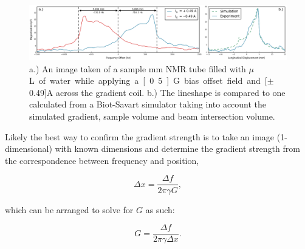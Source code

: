\documentclass[PaulGanssle-Thesis.tex]{subfiles}
\begin{document}
\begin{figure}[ht!]
\includegraphics[width=\tw]{figures/coils/GradientImage.png}
\caption{a.) An image taken of a sample \unit[5]{mm} NMR tube filled with \unit[100]{$\mu$L} of water while applying a \unit[0.5]{G} bias offset field and \unit[$\pm$0.49]{A} across the gradient coil. b.) The lineshape is compared to one calculated from a Biot-Savart simulator taking into account the simulated gradient, sample volume and beam intersection volume.}
\label{fig:GradientImage}
\end{figure}

Likely the best way to confirm the gradient strength is to take an image (1-dimensional) with known dimensions and determine the gradient strength from the correspondence between frequency and position,

\begin{equation}
\Delta x = \frac{\Delta f}{2\pi\gamma G},
\label{eqn:FrequencyPosition}
\end{equation}

which can be arranged to solve for $G$ as such:

\begin{equation}
G = \frac{\Delta f}{2\pi\gamma\Delta x}.
\end{equation}
\end{document}
